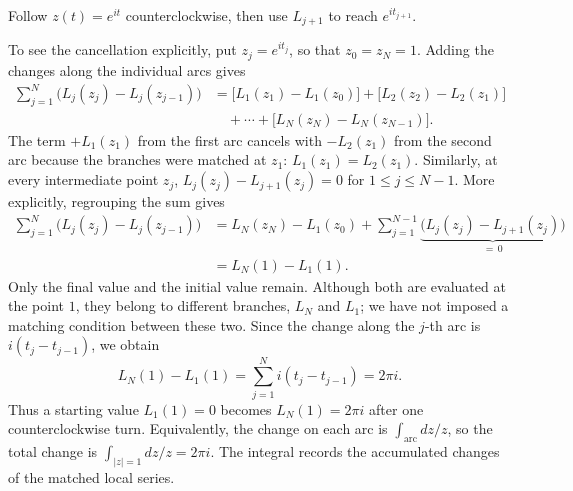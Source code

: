 \documentclass[11pt]{article}
\theoremstyle{plain}
\theoremstyle{definition}
\theoremstyle{remark}
\numberwithin{equation}{section}
\newenvironment{lecturefigure}
 {\par\addvspace{0.25em}\begingroup\setlength{\parskip}{0pt}\centering}
 {\par\endgroup\addvspace{0.25em}}
\begin{document}
\begin{lecturefigure}

{\small Follow $z(t)=e^{it}$ counterclockwise, then use $L_{j+1}$
to reach $e^{it_{j+1}}$.}
\end{lecturefigure}

To see the cancellation explicitly, put $z_j=e^{it_j}$, so that
$z_0=z_N=1$. Adding the changes along the individual arcs gives
\begin{align*}
 \sum_{j=1}^N\bigl(L_j(z_j)-L_j(z_{j-1})\bigr)
 &=\bigl[L_1(z_1)-L_1(z_0)\bigr]
   +\bigl[L_2(z_2)-L_2(z_1)\bigr]\\
 &\quad+\cdots+\bigl[L_N(z_N)-L_N(z_{N-1})\bigr].
\end{align*}
The term $+L_1(z_1)$ from the first arc cancels with $-L_2(z_1)$
from the second arc because the branches were matched at $z_1$:
$L_1(z_1)=L_2(z_1)$. Similarly, at every intermediate point $z_j$,
$L_j(z_j)-L_{j+1}(z_j)=0$ for $1\leq j\leq N-1$.
More explicitly, regrouping the sum gives
\begin{align*}
 \sum_{j=1}^N\bigl(L_j(z_j)-L_j(z_{j-1})\bigr)
 &=L_N(z_N)-L_1(z_0)
   +\sum_{j=1}^{N-1}\underbrace{\bigl(L_j(z_j)-L_{j+1}(z_j)\bigr)}_{=\,0}\\
 &=L_N(1)-L_1(1).
\end{align*}
Only the final value and the initial value remain. Although both are
evaluated at the point $1$, they belong to different branches, $L_N$
and $L_1$; we have not imposed a matching condition between these two.
Since the change along the $j$-th arc is $i(t_j-t_{j-1})$, we obtain
\[
 \boxed{L_N(1)-L_1(1)
 =\sum_{j=1}^N i(t_j-t_{j-1})=2\pi i.}
\]
Thus a starting value $L_1(1)=0$ becomes $L_N(1)=2\pi i$ after one
counterclockwise turn. Equivalently, the change on each arc is
$\int_{\text{arc}}dz/z$, so the total change is
$\int_{|z|=1}dz/z=2\pi i$. The integral records the accumulated changes
of the matched local series.
\end{document}
